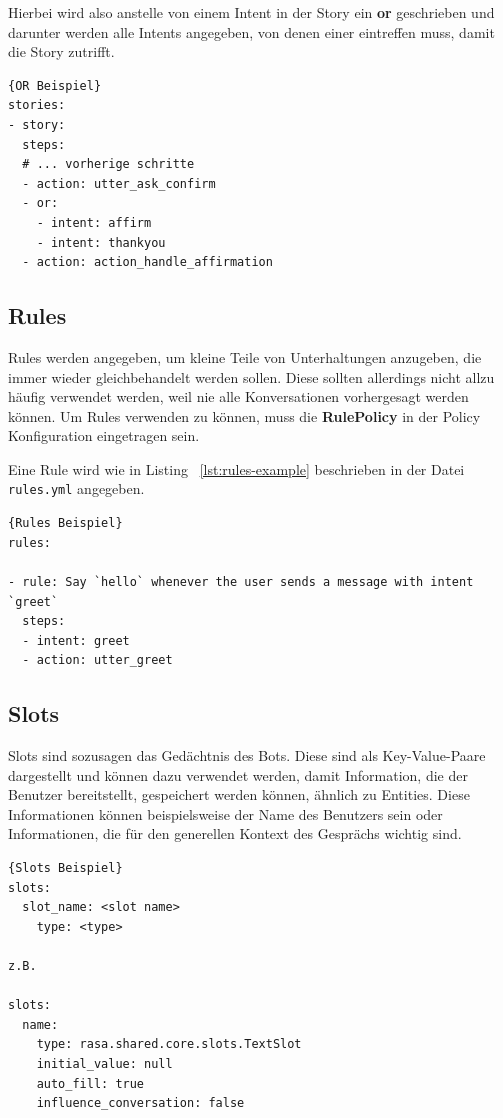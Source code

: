 Hierbei wird also anstelle von einem Intent in der Story ein \textbf{or} geschrieben und darunter werden alle Intents angegeben, von denen einer eintreffen muss, damit die Story zutrifft.

\begin{lstlisting}[label={lst:or-example},caption={OR Beispiel}]{OR Beispiel}
stories:
- story:
  steps:
  # ... vorherige schritte
  - action: utter_ask_confirm
  - or:
    - intent: affirm
    - intent: thankyou
  - action: action_handle_affirmation
\end{lstlisting}

\subsection{Rules}\label{subsec:Rules}

Rules werden angegeben, um kleine Teile von Unterhaltungen anzugeben, die immer wieder gleichbehandelt werden sollen.
Diese sollten allerdings nicht allzu häufig verwendet werden, weil nie alle Konversationen vorhergesagt werden können.
Um Rules verwenden zu können, muss die \textbf{RulePolicy} in der Policy Konfiguration eingetragen sein.\cite{rules}

Eine Rule wird wie in Listing ~\ref{lst:rules-example} beschrieben in der Datei \texttt{rules.yml} angegeben.

\begin{lstlisting}[label={lst:rules-example},caption={Rules Beispiel}]{Rules Beispiel}
rules:

- rule: Say `hello` whenever the user sends a message with intent `greet`
  steps:
  - intent: greet
  - action: utter_greet
\end{lstlisting}

\subsection{Slots}\label{subsec:slots}

Slots sind sozusagen das Gedächtnis des Bots.
Diese sind als Key-Value-Paare dargestellt und können dazu verwendet werden, damit Information, die der Benutzer bereitstellt, gespeichert werden können, ähnlich zu Entities.
Diese Informationen können beispielsweise der Name des Benutzers sein oder Informationen, die für den generellen Kontext des Gesprächs wichtig sind.\cite{slots}

\begin{lstlisting}[label={lst:slots-example},caption={Slots Beispiel}]{Slots Beispiel}
slots:
  slot_name: <slot name>
    type: <type>

z.B.

slots:
  name:
    type: rasa.shared.core.slots.TextSlot
    initial_value: null
    auto_fill: true
    influence_conversation: false
\end{lstlisting}

